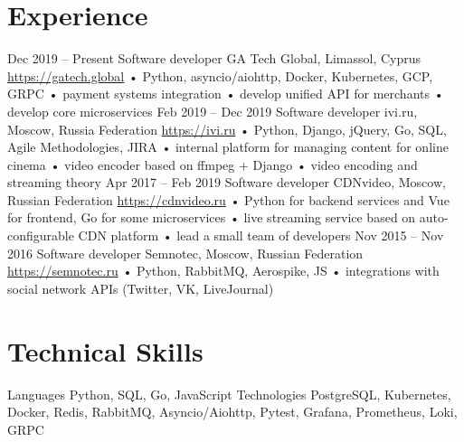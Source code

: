 \documentclass[11pt,a4paper]{moderncv}
\begin{document}
\maketitle

\section{Experience}
\cventry
  {Dec 2019 – Present}
  {Software developer}
  {GA Tech Global, Limassol, Cyprus}
  {\newline{}\url{https://gatech.global}}{}
  {
    • Python, asyncio/aiohttp, Docker, Kubernetes, GCP, GRPC\newline{}
    • payment systems integration\newline{}
    • develop unified API for merchants\newline{}
    • develop core microservices
  }
\cventry
  {Feb 2019 – Dec 2019}
  {Software developer}
  {ivi.ru, Moscow, Russia Federation}
  {\newline{}\url{https://ivi.ru}}{}
  {
    • Python, Django, jQuery, Go, SQL, Agile Methodologies, JIRA\newline{}
    • internal platform for managing content for online cinema\newline{}
    • video encoder based on ffmpeg + Django\newline{}
    • video encoding and streaming theory
   }
\cventry
  {Apr 2017 – Feb 2019}
  {Software developer}
  {CDNvideo, Moscow, Russian Federation}
  {\newline{}\url{https://cdnvideo.ru}}{}
  {
    • Python for backend services and Vue for frontend, Go for some microservices\newline{}
    • live streaming service based on auto-configurable CDN platform\newline{}
    • lead a small team of developers\newline{}
   }
\cventry
  {Nov 2015 – Nov 2016}
  {Software developer}
  {Semnotec, Moscow, Russian Federation}
  {\newline{}\url{https://semnotec.ru}}{}
  {
    • Python, RabbitMQ, Aerospike, JS\newline{}
    • integrations with social network APIs (Twitter, VK, LiveJournal)\newline{}
   }

\section{Technical Skills}
\cvline
  {Languages}{
    Python,
    SQL,
    Go,
    JavaScript
  }
\cvline
  {Technologies}{
    PostgreSQL,
    Kubernetes,
    Docker,
    Redis,
    RabbitMQ,
    Asyncio/Aiohttp,
    Pytest,
    Grafana,
    Prometheus,
    Loki,
    GRPC
  }
\end{document}
